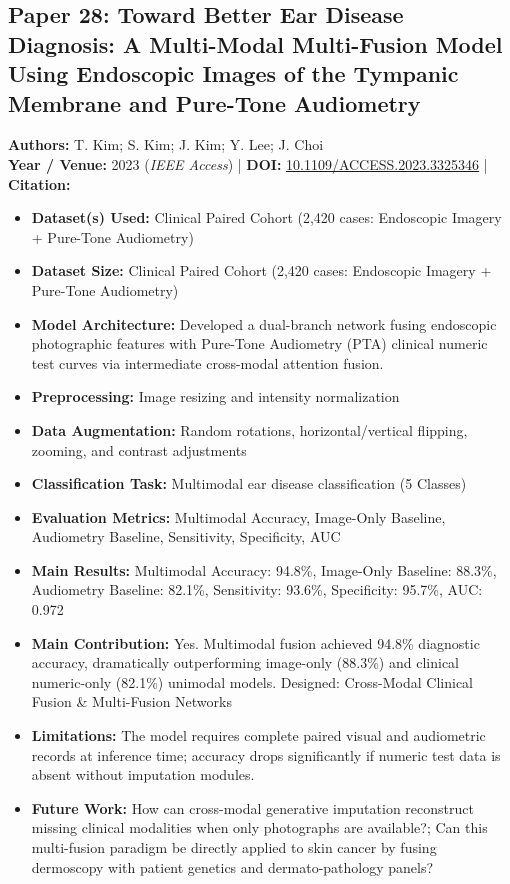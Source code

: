 \documentclass[11pt,a4paper]{article}
\begin{document}
\subsection{Paper 28: Toward Better Ear Disease Diagnosis: A Multi-Modal Multi-Fusion Model Using Endoscopic Images of the Tympanic Membrane and Pure-Tone Audiometry}
\textbf{Authors:} T. Kim; S. Kim; J. Kim; Y. Lee; J. Choi \\
\textbf{Year / Venue:} 2023 (\textit{IEEE Access}) | \textbf{DOI:} \href{https://doi.org/10.1109/ACCESS.2023.3325346}{10.1109/ACCESS.2023.3325346} | \textbf{Citation:} \cite{10286540}

\begin{itemize}\small
\item \textbf{Dataset(s) Used:} Clinical Paired Cohort (2,420 cases: Endoscopic Imagery + Pure-Tone Audiometry)
\item \textbf{Dataset Size:} Clinical Paired Cohort (2,420 cases: Endoscopic Imagery + Pure-Tone Audiometry)
\item \textbf{Model Architecture:} Developed a dual-branch network fusing endoscopic photographic features with Pure-Tone Audiometry (PTA) clinical numeric test curves via intermediate cross-modal attention fusion.
\item \textbf{Preprocessing:} Image resizing and intensity normalization
\item \textbf{Data Augmentation:} Random rotations, horizontal/vertical flipping, zooming, and contrast adjustments
\item \textbf{Classification Task:} Multimodal ear disease classification (5 Classes)
\item \textbf{Evaluation Metrics:} Multimodal Accuracy, Image-Only Baseline, Audiometry Baseline, Sensitivity, Specificity, AUC
\item \textbf{Main Results:} Multimodal Accuracy: 94.8\%, Image-Only Baseline: 88.3\%, Audiometry Baseline: 82.1\%, Sensitivity: 93.6\%, Specificity: 95.7\%, AUC: 0.972
\item \textbf{Main Contribution:} Yes. Multimodal fusion achieved 94.8\% diagnostic accuracy, dramatically outperforming image-only (88.3\%) and clinical numeric-only (82.1\%) unimodal models. Designed: Cross-Modal Clinical Fusion \& Multi-Fusion Networks
\item \textbf{Limitations:} The model requires complete paired visual and audiometric records at inference time; accuracy drops significantly if numeric test data is absent without imputation modules.
\item \textbf{Future Work:} How can cross-modal generative imputation reconstruct missing clinical modalities when only photographs are available?; Can this multi-fusion paradigm be directly applied to skin cancer by fusing dermoscopy with patient genetics and dermato-pathology panels?

\end{itemize}
\end{document}
